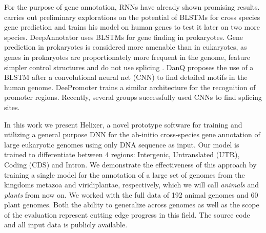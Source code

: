 \documentclass{bioinfo}
\begin{document}
For the purpose of gene annotation, RNNs have already shown promising results. 
\citep{choudharypredicting} carries out preliminary explorations on the potential 
of BLSTMs for cross species gene prediction and trains his model on human genes to 
test it later on two more species. DeepAnnotator \citep{amin2018deepannotator} uses 
BLSTMs for gene finding in prokaryotes. Gene prediction in 
prokaryotes is considered more amenable than in eukaryotes, as genes in prokaryotes 
are proportionately more frequent in the genome, feature simpler control structures 
and do not use splicing \citep{wang2004brief}. DanQ \citep{quang2016danq} proposes 
the use of a BLSTM after a convolutional neural net (CNN) to find detailed motifs in 
the human genome. DeePromoter \citep{oubounyt2019deepromoter} trains a similar 
architecture for the recognition of promoter regions. Recently, several groups 
\citep{jaganathan2019predicting, wang2019splicefinder} successfully used CNNs to 
find splicing sites.

In this work we present Helixer, a novel prototype software for training and 
utilizing a general purpose DNN for the ab-initio cross-species gene annotation of 
large eukaryotic genomes using only DNA sequence as input. Our model is trained to 
differentiate between 4 regions: Intergenic, Untranslated (UTR), Coding (CDS) and 
Intron. We demonstrate the effectiveness of this approach by training a single model 
for the annotation of a large set of genomes from the kingdoms metazoa and 
viridiplantae, respectively, which we will call {\it animals} and {\it plants} from 
now on. We worked with the full data of 192 animal genomes and 60 plant genomes. 
Both the ability to generalize across genomes as well as the scope of the evaluation 
represent cutting edge progress in this field. The source code and all input data 
is publicly available.
\end{document}
